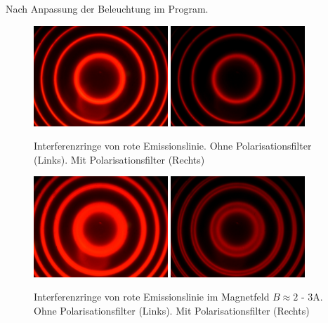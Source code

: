 	Nach Anpassung der Beleuchtung im Program.
	\begin{figure}[!ht]
	    \centering
	    \includegraphics[width=0.45\textwidth]{images/Capture_811.bmp.jpg}
	    \hspace{1em}
	    \includegraphics[width=0.45\textwidth]{images/Capture_812.bmp.jpg}
	    \caption{Interferenzringe von rote Emissionslinie. Ohne Polarisationsfilter (Links). Mit Polarisationsfilter (Rechts)}
	    \label{fig:red-fringes-pol}
	    \vspace{-0.5em}
	\end{figure}
	\begin{figure}[!ht]
	    \centering
	    \includegraphics[width=0.45\textwidth]{images/Capture_814.bmp.jpg}
	    \hspace{1em}
	    \includegraphics[width=0.45\textwidth]{images/Capture_813.bmp.jpg}
	    \caption{Interferenzringe von rote Emissionslinie im Magnetfeld $B \approx 2\text{ - }3 \si{\ampere}$. Ohne Polarisationsfilter (Links). Mit Polarisationsfilter (Rechts)}
	    \label{fig:red-fringes-pol-B}
	    \vspace{-0.5em}
	\end{figure}
